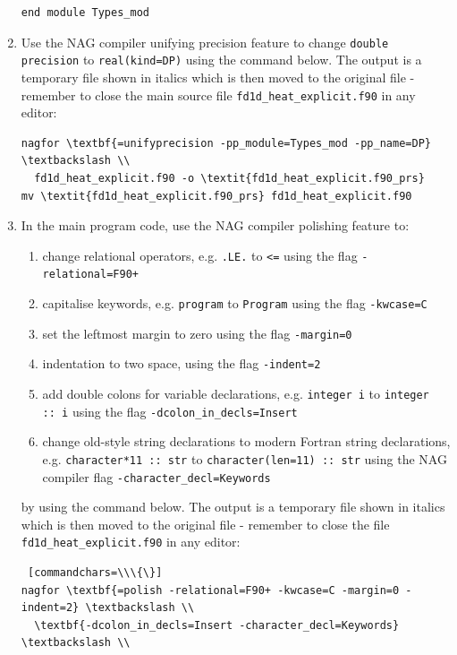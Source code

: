 \documentclass[12pt]{article}
\begin{document}
\begin{enumerate}
\begin{lstlisting}
end module Types_mod
\end{lstlisting} 
\item Use the NAG compiler unifying precision feature to change \texttt{double precision} to \texttt{real(kind=DP)}
  using the command below. The output is a temporary file shown in italics which is then moved to the original file -
  remember to close the main source file \texttt{fd1d\_heat\_explicit.f90} in any editor:
\begin{Verbatim}[commandchars=\\\{\}]
nagfor \textbf{=unifyprecision -pp_module=Types_mod -pp_name=DP} \textbackslash \\
  fd1d_heat_explicit.f90 -o \textit{fd1d_heat_explicit.f90_prs}
mv \textit{fd1d_heat_explicit.f90_prs} fd1d_heat_explicit.f90
\end{Verbatim}
\item In the main program code, use the NAG compiler polishing feature to:
\begin{enumerate}
\item change relational operators, e.g. \texttt{.LE.} to \texttt{<=} using the flag \texttt{-relational=F90+}
\item capitalise keywords, e.g. \texttt{program} to \texttt{Program} using the flag \texttt{-kwcase=C}
\item set the leftmost margin to zero using the flag \texttt{-margin=0}
\item indentation to two space, using the flag \texttt{-indent=2}
\item add double colons for variable declarations, e.g. \texttt{integer i} to \texttt{integer ::\ i} using the flag
  \texttt{-dcolon\_in\_decls=Insert}
\item change old-style string declarations to modern Fortran string declarations, e.g. \texttt{character*11 ::\ str} to
\texttt{character(len=11) ::\ str} using the NAG compiler flag \texttt{-character\_decl=Keywords}
\end{enumerate}
by using the command below. The output is a temporary file shown in italics which is then moved to the original file
- remember to close the file \texttt{fd1d\_heat\_explicit.f90} in any editor:
\begin{Verbatim} [commandchars=\\\{\}]
nagfor \textbf{=polish -relational=F90+ -kwcase=C -margin=0 -indent=2} \textbackslash \\
  \textbf{-dcolon_in_decls=Insert -character_decl=Keywords} \textbackslash \\

\end{Verbatim}
\end{enumerate}
\end{document}
